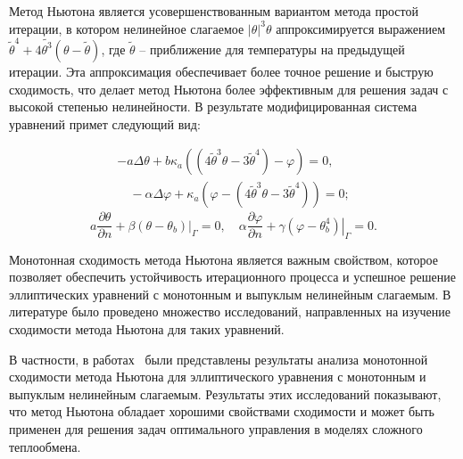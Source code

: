 Метод Ньютона является усовершенствованным вариантом метода простой итерации,
в котором нелинейное слагаемое $|\theta|^3 \theta$ аппроксимируется
выражением $\widetilde{\theta}^4+4 \widetilde{\theta^3}(\theta-\widetilde{\theta})$,
где $\widetilde{\theta}$ --  приближение для температуры на предыдущей итерации.
Эта аппроксимация обеспечивает более точное решение и быструю сходимость,
что делает метод Ньютона более эффективным для
решения задач с высокой степенью нелинейности.
В результате модифицированная система уравнений примет следующий вид:

\begin{equation}
    \tag{L1}
    \label{eq:L1}
    \begin{gathered}
        -a \Delta \theta+b \kappa_{a}\left(\left(4 \widetilde{\theta}^{3}
        \theta-3 \widetilde{\theta}^{4}\right)-\varphi\right)=0,\\
        \quad-\alpha \Delta \varphi
        +\kappa_{a}\left(\varphi
        -\left(4 \widetilde{\theta}^{3}
        \theta-3 \widetilde{\theta}^{4}\right)\right)=0;
    \end{gathered}
\end{equation}
\begin{equation}
     \tag{L2}
    \label{eq:L2}
        a \frac{\partial \theta}{\partial n}
        +\left.\beta\left(\theta-\theta_{b}\right)\right|_{\Gamma}=0,
        \quad \alpha \frac{\partial \varphi}{\partial n}
        +\left.\gamma\left(\varphi-\theta_{b}^{4}\right)\right|_{\Gamma}=0.
\end{equation}

Монотонная сходимость метода Ньютона является важным свойством,
которое позволяет обеспечить устойчивость итерационного процесса
и успешное решение эллиптических уравнений
с монотонным и выпуклым нелинейным слагаемым.
В литературе было проведено множество исследований, направленных
на изучение сходимости метода Ньютона для таких уравнений.

В частности, в работах~\cite{Mukhamadiev1971, Schryer1971} были представлены
результаты анализа монотонной сходимости метода Ньютона для эллиптического
уравнения с монотонным и выпуклым нелинейным слагаемым.
Результаты этих исследований показывают, что метод Ньютона обладает
хорошими свойствами сходимости и может быть применен для решения
задач оптимального управления в моделях сложного теплообмена.

